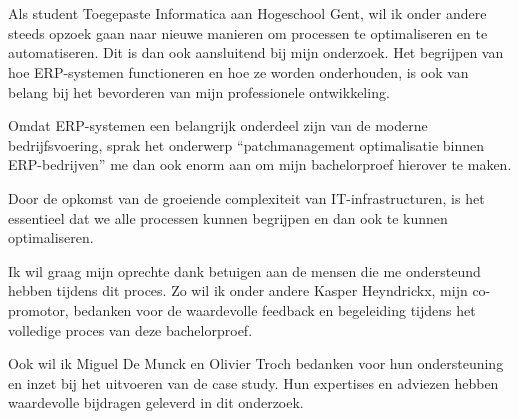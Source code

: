 
\chapter*{}%
\label{ch:voorwoord}



Als student Toegepaste Informatica aan Hogeschool Gent, wil ik onder andere steeds opzoek gaan naar nieuwe manieren om processen te optimaliseren en te automatiseren. Dit is dan ook aansluitend bij mijn onderzoek. Het begrijpen van hoe ERP-systemen functioneren en hoe ze worden onderhouden, is ook van belang bij het bevorderen van mijn professionele ontwikkeling.

Omdat ERP-systemen een belangrijk onderdeel zijn van de moderne bedrijfsvoering, sprak het onderwerp “patchmanagement optimalisatie binnen ERP-bedrijven” me dan ook enorm aan om mijn bachelorproef hierover te maken.

Door de opkomst van de groeiende complexiteit van IT-infrastructuren, is het essentieel dat we alle processen kunnen begrijpen en dan ook te kunnen optimaliseren.

Ik wil graag mijn oprechte dank betuigen aan de mensen die me ondersteund hebben tijdens dit proces. Zo wil ik onder andere Kasper Heyndrickx, mijn co-promotor, bedanken voor de waardevolle feedback en begeleiding tijdens het volledige proces van deze bachelorproef.

Ook wil ik Miguel De Munck en Olivier Troch bedanken voor hun ondersteuning en inzet bij het uitvoeren van de case study. Hun expertises en adviezen hebben waardevolle bijdragen geleverd in dit onderzoek.


